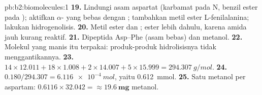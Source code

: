 \begin{solution}{pb:b2:biomolecules:1}
\textbf{19.} Lindungi asam aspartat (karbamat pada N, benzil ester pada
); aktifkan
$\alpha$- yang bebas dengan ; tambahkan metil ester
L-fenilalanina; lakukan hidrogenolisis.
\textbf{20.} Metil ester dan ; ester lebih dahulu, karena amida
jauh kurang reaktif.
\textbf{21.} Dipeptida Asp--Phe (asam bebas) dan metanol.
\textbf{22.} Molekul yang manis itu terpakai: produk-produk hidrolisisnya
tidak menggantikannya.
\textbf{23.} $14 \times 12.011 + 18 \times 1.008 + 2 \times 14.007 + 5 \times 15.999 =
\qty{294.307}{g/mol}$.
\textbf{24.} $0.180/294.307 = \qty{6.116e-4}{mol}$, yaitu \qty{0.612}{mmol}.
\textbf{25.} Satu metanol per aspartam: $0.6116 \times 32.042 = \boldsymbol{\approx \qty{19.6}{mg}}$
metanol.
\end{solution}
